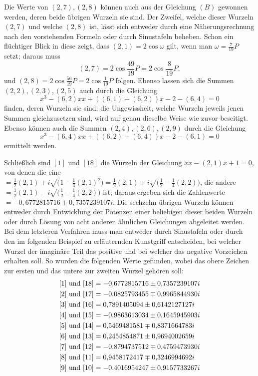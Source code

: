Die Werte von \((2,7),\allowbreak (2,8)\) können auch aus der Gleichung \((B)\) gewonnen werden, deren beide übrigen Wurzeln sie sind. Der Zweifel, welche dieser Wurzeln \((2,7)\) und welche \((2,8)\) ist, lässt sich entweder durch eine Näherungsrechnung nach den vorstehenden Formeln oder durch Sinustafeln beheben. Schon ein flüchtiger Blick in diese zeigt, dass \((2,1)=2\cos\omega\) gilt, wenn man \(\omega=\frac7{19}P\) setzt; daraus muss \[(2,7)=2\cos\frac{49}{19}P=2\cos\frac8{19}P,\] und \((2,8)=2\cos\frac{56}{19}P=2\cos\frac1{19}P\) folgen. Ebenso lassen sich die Summen \((2,2),\allowbreak (2,3),\allowbreak (2,5)\) auch durch die Gleichung \[x^3-(6,2)xx+((6,1)+(6,2))x-2-(6,4)=0\] finden, deren Wurzeln sie sind; die Ungewissheit, welche Wurzeln jeweils jenen Summen gleichzusetzen sind, wird auf genau dieselbe Weise wie zuvor beseitigt. Ebenso können auch die Summen \((2,4),\allowbreak (2,6),\allowbreak (2,9)\) durch die Gleichung \[x^3-(6,4)xx+((6,2)+(6,4))x-2-(6,1)=0\] ermittelt werden.

Schließlich sind \([1]\) und \([18]\) die Wurzeln der Gleichung \(xx-(2,1)x+1=0\), von denen die eine \(=\frac12(2,1)+i\surd(1-\frac14(2,1)^2)=\frac12(2,1)+i\surd(\frac12-\frac14(2,2))\), die andere \(=\frac12(2,1)-i\surd(\frac12-\frac14(2,2))\) ist; daraus ergeben sich die Zahlenwerte \(=-0{,}6772815716\pm0{,}7357239107i\). Die sechzehn übrigen Wurzeln können entweder durch Entwicklung der Potenzen einer beliebigen dieser beiden Wurzeln oder durch Lösung von acht anderen ähnlichen Gleichungen abgeleitet werden. Bei dem letzteren Verfahren muss man entweder durch Sinustafeln oder durch den im folgenden Beispiel zu erläuternden Kunstgriff entscheiden, bei welcher Wurzel der imaginäre Teil das positive und bei welcher das negative Vorzeichen erhalten soll. So wurden die folgenden Werte gefunden, wobei das obere Zeichen zur ersten und das untere zur zweiten Wurzel gehören soll: \[\begin{aligned}\relax[1]\text{ und }[18]&=-0{,}6772815716\pm0{,}7357239107i\\\relax[2]\text{ und }[17]&=-0{,}0825793455\mp0{,}9965844930i\\\relax[3]\text{ und }[16]&=0{,}7891405094\pm0{,}6142127127i\\\relax[4]\text{ und }[15]&=-0{,}9863613034\pm0{,}1645945903i\\\relax[5]\text{ und }[14]&=0{,}5469481581\mp0{,}8371664783i\\\relax[6]\text{ und }[13]&=0{,}2454854871\pm0{,}9694002659i\\\relax[7]\text{ und }[12]&=-0{,}8794737512\mp0{,}4759473930i\\\relax[8]\text{ und }[11]&=0{,}9458172417\mp0{,}3246994692i\\\relax[9]\text{ und }[10]&=-0.4016954247\pm0{,}9157733267i\end{aligned}\]


